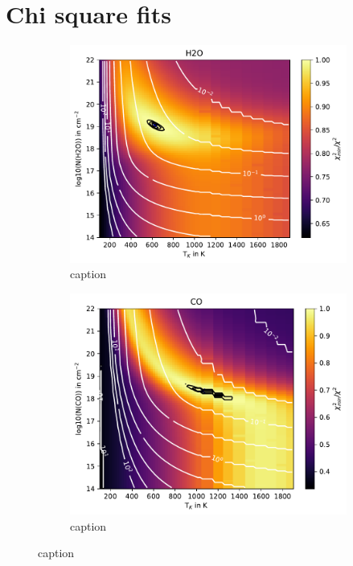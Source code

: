 \documentclass[oneside, single, authoryear, semicolon, 12pt]{lion-msc}
\newcommand{\4}{$_4$}
\newcommand{\3}{$_3$}
\newcommand{\2}{$_2$}
\begin{document}
\chapter{Chi square fits}
\begin{figure}[!ht]
    \centering
    \begin{subfigure}[b]{0.49\textwidth}
        \centering
        \includegraphics[width=\textwidth]{radexpy_niels/Radexpy_for_Niels/chi2_map_H2O_GWLup.pdf}
        \caption{caption}
    \end{subfigure}
    \hfill
    \begin{subfigure}[b]{0.49\textwidth}
        \centering
        \includegraphics[width=\textwidth]{radexpy_niels/Radexpy_for_Niels/chi2_map_CO_GWLup.pdf}
        \caption{caption}
    \end{subfigure}
    \caption{caption}
\end{figure}
\end{document}
